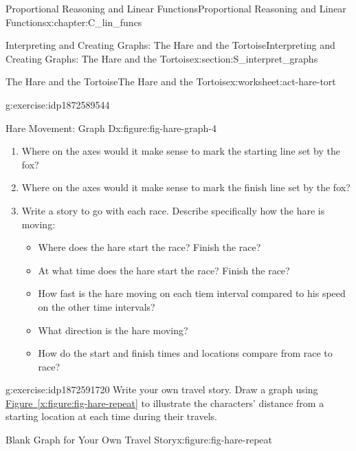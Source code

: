 \documentclass[oneside,10pt,]{book}
\newcommand{\xreffont}{\relax}
\numberwithin{equation}{chapter}
\begin{document}
\begin{chapterptx}{Proportional Reasoning and Linear Functions}{}{Proportional Reasoning and Linear Functions}{}{}{x:chapter:C_lin_funcs}
\begin{sectionptx}{Interpreting and Creating Graphs: The Hare and the Tortoise}{}{Interpreting and Creating Graphs: The Hare and the Tortoise}{}{}{x:section:S_interpret_graphs}
\begin{worksheet-subsection}{The Hare and the Tortoise}{}{The Hare and the Tortoise}{}{}{x:worksheet:act-hare-tort}
\begin{divisionexercise}{2}{}{}{g:exercise:idp1872589544}
\begin{sidebyside}{2}{0}{0}{0}
\begin{sbspanel}{0.5}
\begin{figureptx}{Hare Movement: Graph D}{x:figure:fig-hare-graph-4}{}
\tcblower
\end{figureptx}%
\end{sbspanel}%
\end{sidebyside}%
\begin{enumerate}[font=\bfseries,label=(\alph*),ref=\alph*]
\item{}Where on the axes would it make sense to mark the starting line set by the fox?%
\item{}Where on the axes would it make sense to mark the finish line set by the fox?%
\item{}Write a story to go with each race. Describe specifically how the hare is moving:%
\begin{itemize}[label=\textbullet]
\item{}Where does the hare start the race? Finish the race?%
\item{}At what time does the hare start the race? Finish the race?%
\item{}How fast is the hare moving on each tiem interval compared to his speed on the other time intervals?%
\item{}What direction is the hare moving?%
\item{}How do the start and finish times and locations compare from race to race?%
\end{itemize}
%
\end{enumerate}
\end{divisionexercise}%
\begin{divisionexercise}{3}{}{}{g:exercise:idp1872591720}%
Write your own travel story. Draw a graph using \hyperref[x:figure:fig-hare-repeat]{Figure~{\xreffont\ref{x:figure:fig-hare-repeat}}} to illustrate the characters' distance from a starting location at each time during their travels.%
\begin{figureptx}{Blank Graph for Your Own Travel Story}{x:figure:fig-hare-repeat}{}%
\begin{image}{0.15}{0.7}{0.15}%

\end{image}
\end{figureptx}
\end{divisionexercise}
\end{worksheet-subsection}
\end{sectionptx}
\end{chapterptx}
\end{document}
